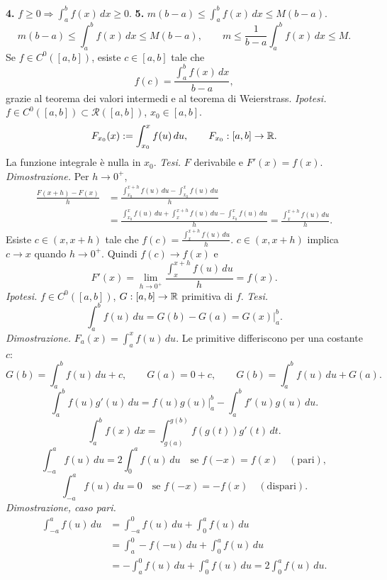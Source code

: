 \textbf{4.} $f\ge0\Longrightarrow\int_a^b f(x)\,dx\ge0$.
\textbf{5.} $\displaystyle m(b-a)\le\int_a^b f(x)\,dx\le M(b-a)$.
\[m(b-a)\le\int_a^b f(x)\,dx\le M(b-a),\qquad
m\le\frac1{b-a}\int_a^b f(x)\,dx\le M.\]
Se $f\in C^0([a,b])$, esiste $c\in[a,b]$ tale che
\[f(c)=\frac{\int_a^b f(x)\,dx}{b-a},\]
grazie al teorema dei valori intermedi e al teorema di Weierstrass.
\textit{Ipotesi.} $f\in C^0([a,b])\subset\mathcal R([a,b])$, $x_0\in[a,b]$.
\[F_{x_0}(x):=\int_{x_0}^x f(u)\,du,\qquad F_{x_0}:[a,b]\to\mathbb R.\]
La funzione integrale è nulla in $x_0$.
\textit{Tesi.} $F$ derivabile e $F'(x)=f(x)$.
\textit{Dimostrazione.} Per $h\to0^+$,
\begin{align*}
\frac{F(x+h)-F(x)}h&=\frac{\int_{x_0}^{x+h}f(u)\,du-\int_{x_0}^xf(u)\,du}{h}\\
&=\frac{\int_{x_0}^xf(u)\,du+\int_x^{x+h}f(u)\,du-\int_{x_0}^xf(u)\,du}{h}
=\frac{\int_x^{x+h}f(u)\,du}{h}.
\end{align*}
Esiste $c\in(x,x+h)$ tale che $\displaystyle f(c)=\frac{\int_x^{x+h}f(u)\,du}{h}$.
$c\in(x,x+h)$ implica $c\to x$ quando $h\to0^+$. Quindi $f(c)\to f(x)$ e
\[F'(x)=\lim_{h\to0^+}\frac{\int_x^{x+h}f(u)\,du}{h}=f(x).\]
\textit{Ipotesi.} $f\in C^0([a,b])$, $G:[a,b]\to\mathbb R$ primitiva di $f$.
\textit{Tesi.}
\[\int_a^bf(u)\,du=G(b)-G(a)=\left.G(x)\right|_a^b.\]
\textit{Dimostrazione.} $F_a(x)=\int_a^x f(u)\,du$. Le primitive differiscono per una costante $c$:
\[G(b)=\int_a^bf(u)\,du+c,\qquad G(a)=0+c,\qquad
G(b)=\int_a^bf(u)\,du+G(a).\]
\[\int_a^b f(u)g'(u)\,du=\left.f(u)g(u)\right|_a^b-\int_a^bf'(u)g(u)\,du.\]
\[\int_a^bf(x)\,dx=\int_{g(a)}^{g(b)}f(g(t))g'(t)\,dt.\]
\[\int_{-a}^a f(u)\,du=2\int_0^af(u)\,du\quad\text{se }f(-x)=f(x)\quad(\text{pari}),\]
\[\int_{-a}^a f(u)\,du=0\quad\text{se }f(-x)=-f(x)\quad(\text{dispari}).\]
\textit{Dimostrazione, caso pari.}
\begin{align*}
\int_{-a}^af(u)\,du&=\int_{-a}^0f(u)\,du+\int_0^af(u)\,du\\
&=\int_a^0-f(-u)\,du+\int_0^af(u)\,du\\
&=-\int_a^0f(u)\,du+\int_0^af(u)\,du=2\int_0^af(u)\,du.
\end{align*}
